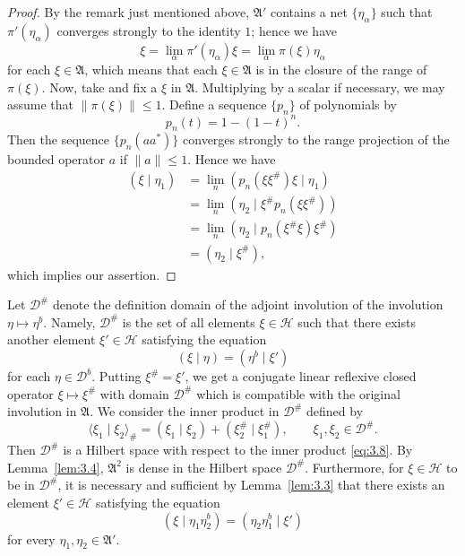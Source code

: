 \documentclass[12pt,b5paper,twoside]{article}
\theoremstyle{takesaki}
\numberwithin{equation}{section}
\begin{document}
\begin{proof}
By the remark just mentioned above, $\mathfrak A'$ contains a net
$\{\eta_\alpha\}$ such that $\pi'(\eta_\alpha)$ converges strongly to
the identity $1$; hence we have
\[
 \xi=\lim_\alpha\pi'(\eta_\alpha)\xi
    =\lim_\alpha\pi(\xi)\eta_\alpha
\]
for each $\xi\in\mathfrak A$, which means that each $\xi\in\mathfrak A$
is in the closure of the range of $\pi(\xi)$.  Now, take and fix a
$\xi$ in $\mathfrak A$.  Multiplying by a scalar if necessary, we may
assume that $\|\pi(\xi)\|\leq1$.  Define a sequence $\{p_n\}$ of
polynomials by
\begin{equation}
 p_n(t)=1-(1-t)^n.
 \tag{3.7}\label{eq:3.7}
\end{equation}
Then the sequence $\{p_n(aa^*)\}$ converges strongly to the range
projection of the bounded operator $a$ if $\|a\|\leq1$.  Hence we have
\begin{align*}
 (\xi\mid\eta_1)
   &=\lim_n(p_n(\xi\xi^\#)\xi\mid\eta_1)\\
   &=\lim_n(\eta_2\mid\xi^\#p_n(\xi\xi^\#))\\
   &=\lim_n(\eta_2\mid p_n(\xi^\#\xi)\xi^\#)\\
   &=(\eta_2\mid\xi^\#),
\end{align*}
which implies our assertion.
\end{proof}

Let $\mathcal D^\#$ denote the definition domain of the adjoint
involution of the involution $\eta\mapsto\eta^b$.  Namely,
$\mathcal D^\#$ is the set of all elements $\xi\in\mathcal H$ such that
there exists another element $\xi'\in\mathcal H$ satisfying the equation
\[
 (\xi\mid\eta)=(\eta^b\mid\xi')
\]
for each $\eta\in\mathcal D^b$.  Putting $\xi^\#=\xi'$, we get a
conjugate linear reflexive closed operator $\xi\mapsto\xi^\#$ with
domain $\mathcal D^\#$ which is compatible with the original involution
in $\mathfrak A$.  We consider the inner product in $\mathcal D^\#$
defined by
\begin{equation}
 \langle\xi_1\mid\xi_2\rangle_\#
 =(\xi_1\mid\xi_2)+(\xi_2^\#\mid\xi_1^\#),
 \qquad \xi_1,\xi_2\in\mathcal D^\#.
 \tag{3.8}\label{eq:3.8}
\end{equation}
Then $\mathcal D^\#$ is a Hilbert space with respect to the inner
product \eqref{eq:3.8}.  By Lemma~\ref{lem:3.4}, $\mathfrak A^2$ is
dense in the Hilbert space $\mathcal D^\#$.  Furthermore, for
$\xi\in\mathcal H$ to be in $\mathcal D^\#$, it is necessary and
sufficient by Lemma~\ref{lem:3.3} that there exists an element
$\xi'\in\mathcal H$ satisfying the equation
\[
 (\xi\mid\eta_1\eta_2^b)=(\eta_2\eta_1^b\mid\xi')
\]
for every $\eta_1,\eta_2\in\mathfrak A'$.
\end{document}
